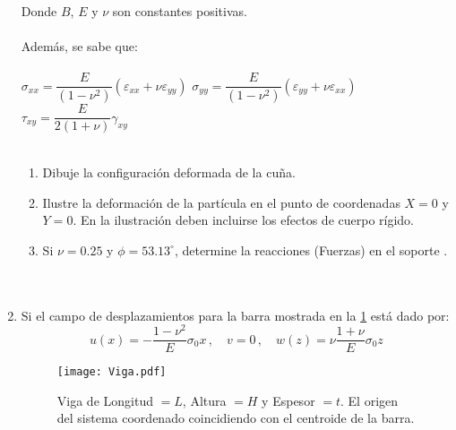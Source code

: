 \documentclass[../notas medios.tex]{subfiles}
\begin{document}
\begin{enumerate}
Donde $B$, $E$ y $\nu$ son constantes positivas. \\\\
%
Adem\'as, se sabe que:\\\\
%
 $\sigma_{xx} = \dfrac{E}{(1 - \nu^2)} (\varepsilon_{xx} + \nu \varepsilon_{yy}) $ 
\hspace*{5mm} $\sigma_{yy} = \dfrac{E}{(1 - \nu^2)} (\varepsilon_{yy} + \nu \varepsilon_{xx}) $ 
\hspace*{5mm} $\tau_{xy} = \dfrac{E}{2(1 + \nu)} \gamma_{xy} $\\\\
%
\begin{enumerate}
	\item Dibuje la configuraci\'on deformada de la cu\~na. 
	\item Ilustre la deformaci\'on de la part\'icula en el punto de coordenadas $X = 0$ y $Y = 0$. En la ilustraci\'on deben incluirse los efectos de cuerpo r\'igido. 	
    \item Si $\nu=0.25$ y $\phi=53.13^{\circ}$, determine la reacciones (Fuerzas) en el soporte .\\\\\\
\end{enumerate}

\item  \label{punto10_d} Si el campo de desplazamientos para la barra mostrada 
en la \ref{def:Mario} está dado por:
%
\[u\left( x \right) = -\dfrac{1-\nu^2}{E} \sigma_0 x\, ,\quad v=0\, ,\quad 
w\left( z \right) = \nu \dfrac{1+\nu}{E} \sigma_0 z\]

\begin{figure}[H]
	\centering
	\texttt{[image: Viga.pdf]} 
	\caption{Viga de Longitud $= L$, Altura $=H$ y Espesor $=t$. El origen del sistema coordenado coincidiendo con el centroide de la barra.}
	\label{def:Mario}
\end{figure}


\end{enumerate}
\end{document}
